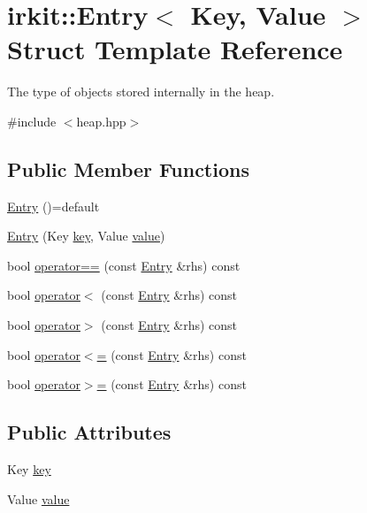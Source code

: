 \hypertarget{structirkit_1_1Entry}{}\section{irkit\+:\+:Entry$<$ Key, Value $>$ Struct Template Reference}
\label{structirkit_1_1Entry}


The type of objects stored internally in the heap.  




{\ttfamily \#include $<$heap.\+hpp$>$}

\subsection*{Public Member Functions}
\begin{DoxyCompactItemize}
\item 
\mbox{\hyperlink{structirkit_1_1Entry_ab8d6ae4f3f3ff0c1934543f2eca895ea}{Entry}} ()=default
\item 
\mbox{\hyperlink{structirkit_1_1Entry_afe9a7f9975902c4622115176169bc80a}{Entry}} (Key \mbox{\hyperlink{structirkit_1_1Entry_aeae4387483b4905afd7dfd71df9104fc}{key}}, Value \mbox{\hyperlink{structirkit_1_1Entry_a72e5dd8efe13d360f7b97c37d05b99b8}{value}})
\item 
bool \mbox{\hyperlink{structirkit_1_1Entry_aaa12df0ae7e66638a6f0e5ddb552167b}{operator==}} (const \mbox{\hyperlink{structirkit_1_1Entry}{Entry}} \&rhs) const
\item 
bool \mbox{\hyperlink{structirkit_1_1Entry_a4112e1db14a84edfe80b4e75ed8a328c}{operator$<$}} (const \mbox{\hyperlink{structirkit_1_1Entry}{Entry}} \&rhs) const
\item 
bool \mbox{\hyperlink{structirkit_1_1Entry_a0c421723ffe0eb3c56d1efc16f5f2fe5}{operator$>$}} (const \mbox{\hyperlink{structirkit_1_1Entry}{Entry}} \&rhs) const
\item 
bool \mbox{\hyperlink{structirkit_1_1Entry_aa84e1aed3325a2c1bfef85b71a20ed74}{operator$<$=}} (const \mbox{\hyperlink{structirkit_1_1Entry}{Entry}} \&rhs) const
\item 
bool \mbox{\hyperlink{structirkit_1_1Entry_a672de7d54aa88d29475e8664422a8e4f}{operator$>$=}} (const \mbox{\hyperlink{structirkit_1_1Entry}{Entry}} \&rhs) const
\end{DoxyCompactItemize}
\subsection*{Public Attributes}
\begin{DoxyCompactItemize}
\item 
Key \mbox{\hyperlink{structirkit_1_1Entry_aeae4387483b4905afd7dfd71df9104fc}{key}}
\item 
Value \mbox{\hyperlink{structirkit_1_1Entry_a72e5dd8efe13d360f7b97c37d05b99b8}{value}}
\end{DoxyCompactItemize}
